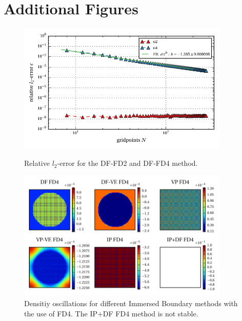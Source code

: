 \chapter{Additional Figures}

\begin{figure}[!h]
    \centering
    \includegraphics[width=0.9\textwidth]{gfx/immersed_boundary/poiseuille_flow/3_df/relative_l2error.pdf}
    \caption{Relative $l_2$-error for the DF-FD2 and DF-FD4 method.}
    \label{fig:vali_pflow_3gc}

  \includegraphics[width=0.9\textwidth]{gfx/immersed_boundary/hpflow/long/rho.pdf}
  \caption{Densitiy oscillations for different Immersed Boundary methods with the use of FD4. The IP+DF FD4 method is not stable.}
    \label{fig:hpflow_allgc_theo}
\end{figure}
\clearpage

